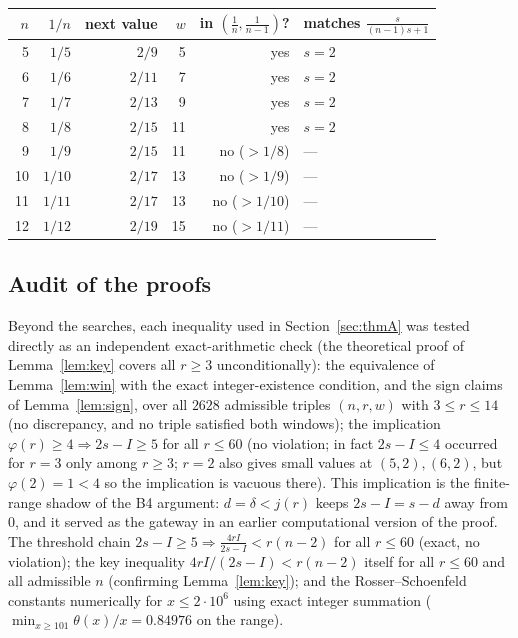 \documentclass[11pt]{article}
\theoremstyle{definition}
\begin{document}
\begin{center}
\small
\begin{tabular}{rrrrrl}
\toprule
$n$ & $1/n$ & next value & $w$ & in $(\frac1n,\frac1{n-1})$? & matches $\frac{s}{(n-1)s+1}$\\
\midrule
5 & $1/5$ & $2/9$ & 5 & yes & $s{=}2$\\
6 & $1/6$ & $2/11$ & 7 & yes & $s{=}2$\\
7 & $1/7$ & $2/13$ & 9 & yes & $s{=}2$\\
8 & $1/8$ & $2/15$ & 11 & yes & $s{=}2$\\
9 & $1/9$ & $2/15$ & 11 & no ($>1/8$) & ---\\
10& $1/10$& $2/17$ & 13 & no ($>1/9$) & ---\\
11& $1/11$& $2/17$ & 13 & no ($>1/10$)& ---\\
12& $1/12$& $2/19$ & 15 & no ($>1/11$)& ---\\
\bottomrule
\end{tabular}
\end{center}

\subsection{Audit of the proofs}
Beyond the searches, each inequality used in Section~\ref{sec:thmA} was
tested directly as an independent exact-arithmetic check (the theoretical proof
of Lemma~\ref{lem:key} covers all $r\ge3$ unconditionally):
the equivalence of Lemma~\ref{lem:win} with the exact integer-existence
condition, and the sign claims of Lemma~\ref{lem:sign}, over all
$2628$ admissible triples $(n,r,w)$ with $3\le r\le14$ (no discrepancy, and
no triple satisfied both windows); the implication $\varphi(r)\ge4\Rightarrow
2s-I\ge5$ for all $r\le60$ (no violation; in fact $2s-I\le4$ occurred for
$r=3$ only among $r\ge3$; $r=2$ also gives small values at $(5,2),(6,2)$,
but $\varphi(2)=1<4$ so the implication is vacuous there). This
implication is the finite-range shadow of the B4 argument: $d=\delta<j(r)$
keeps $2s-I=s-d$ away from $0$, and it served as the gateway in an
earlier computational version of the proof. The threshold chain $2s-I\ge5\Rightarrow\frac{4rI}{2s-I}<r(n-2)$
for all $r\le60$ (exact, no violation); the key inequality
$4rI/(2s-I)<r(n-2)$ itself for all $r\le60$ and all admissible $n$
(confirming Lemma~\ref{lem:key}); and the Rosser--Schoenfeld constants
numerically for $x\le2\cdot10^6$ using exact integer summation ($\min_{x\ge101}\theta(x)/x=0.84976$ on the
range).
\end{document}
